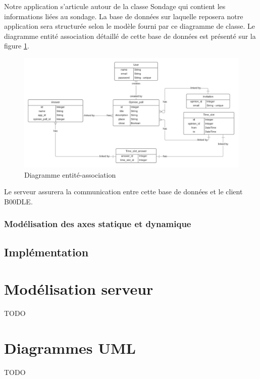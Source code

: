 \documentclass[titlepage]{report}
\begin{document}
\par Notre application s'articule autour de la classe Sondage qui contient les informations liées au sondage. 
La base de données sur laquelle reposera notre application sera structurée selon le modèle fourni par ce diagramme de classe. 
Le diagramme entité association détaillé de cette base de données est présenté sur la figure \ref{diagramme_entiteAssociation}.

\begin{figure}[h]
	\caption{Diagramme entité-association}
	\label{diagramme_entiteAssociation}
	\centering
	\includegraphics[width=\textwidth]{figures/diagrammes/entiteAssociation.png}
\end{figure}

\par Le serveur assurera la communication entre cette base de données et le client B00DLE.

\clearpage

\section{Modélisation des axes statique et dynamique}

\chapter{Implémentation}

\part{Modélisation serveur}
\label{part_modelServer}

\par TODO

\part{Diagrammes UML}
\label{part_allUML}

\par TODO
\end{document}
